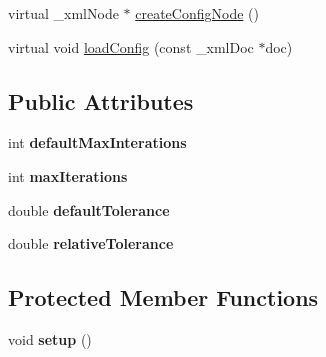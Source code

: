 \begin{DoxyCompactItemize}
\item 
virtual \-\_\-xml\-Node $\ast$ \hyperlink{classrr_1_1_n_l_e_q_interface_a5408873deccb69509d182edcf28e76fa}{create\-Config\-Node} ()
\item 
virtual void \hyperlink{classrr_1_1_n_l_e_q_interface_ab8bacbe256ffab227ab3521d64ab9d31}{load\-Config} (const \-\_\-xml\-Doc $\ast$doc)
\end{DoxyCompactItemize}
\subsection*{Public Attributes}
\begin{DoxyCompactItemize}
\item 
\hypertarget{classrr_1_1_n_l_e_q_interface_a8c2610b7a0258a7424130208a7731c41}{int {\bfseries default\-Max\-Interations}}\label{classrr_1_1_n_l_e_q_interface_a8c2610b7a0258a7424130208a7731c41}

\item 
\hypertarget{classrr_1_1_n_l_e_q_interface_a0b32efd816be125548f9f7de2a3c9ec0}{int {\bfseries max\-Iterations}}\label{classrr_1_1_n_l_e_q_interface_a0b32efd816be125548f9f7de2a3c9ec0}

\item 
\hypertarget{classrr_1_1_n_l_e_q_interface_ae341a135cbd8c70c3c5862e1d9351d82}{double {\bfseries default\-Tolerance}}\label{classrr_1_1_n_l_e_q_interface_ae341a135cbd8c70c3c5862e1d9351d82}

\item 
\hypertarget{classrr_1_1_n_l_e_q_interface_a0597b41c2f1643c2012d45b6f1dc4a05}{double {\bfseries relative\-Tolerance}}\label{classrr_1_1_n_l_e_q_interface_a0597b41c2f1643c2012d45b6f1dc4a05}

\end{DoxyCompactItemize}
\subsection*{Protected Member Functions}
\begin{DoxyCompactItemize}
\item 
\hypertarget{classrr_1_1_n_l_e_q_interface_add58c84d1aa82f4a4298d0119d11db1d}{void {\bfseries setup} ()}\label{classrr_1_1_n_l_e_q_interface_add58c84d1aa82f4a4298d0119d11db1d}

\end{DoxyCompactItemize}
